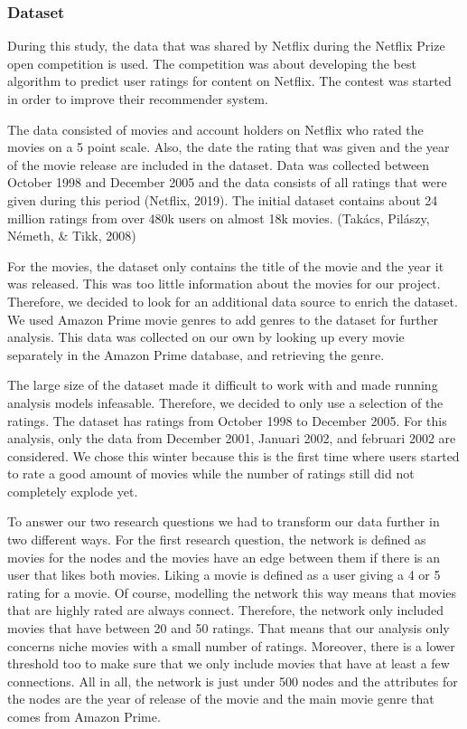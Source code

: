 \documentclass[
  english,
  man,floatsintext]{apa6}
\begin{document}
\hypertarget{dataset}{%
\subsubsection{Dataset}\label{dataset}}

During this study, the data that was shared by Netflix during the Netflix Prize open competition is used. The competition was about developing the best algorithm to predict user ratings for content on Netflix. The contest was started in order to improve their recommender system.

The data consisted of movies and account holders on Netflix who rated the movies on a 5 point scale. Also, the date the rating that was given and the year of the movie release are included in the dataset. Data was collected between October 1998 and December 2005 and the data consists of all ratings that were given during this period (Netflix, 2019). The initial dataset contains about 24 million ratings from over 480k users on almost 18k movies. (Takács, Pilászy, Németh, \& Tikk, 2008)

For the movies, the dataset only contains the title of the movie and the year it was released. This was too little information about the movies for our project. Therefore, we decided to look for an additional data source to enrich the dataset. We used Amazon Prime movie genres to add genres to the dataset for further analysis. This data was collected on our own by looking up every movie separately in the Amazon Prime database, and retrieving the genre.

The large size of the dataset made it difficult to work with and made running analysis models infeasable. Therefore, we decided to only use a selection of the ratings. The dataset has ratings from October 1998 to December 2005. For this analysis, only the data from December 2001, Januari 2002, and februari 2002 are considered. We chose this winter because this is the first time where users started to rate a good amount of movies while the number of ratings still did not completely explode yet.

To answer our two research questions we had to transform our data further in two different ways. For the first research question, the network is defined as movies for the nodes and the movies have an edge between them if there is an user that likes both movies. Liking a movie is defined as a user giving a 4 or 5 rating for a movie. Of course, modelling the network this way means that movies that are highly rated are always connect. Therefore, the network only included movies that have between 20 and 50 ratings. That means that our analysis only concerns niche movies with a small number of ratings. Moreover, there is a lower threshold too to make sure that we only include movies that have at least a few connections. All in all, the network is just under 500 nodes and the attributes for the nodes are the year of release of the movie and the main movie genre that comes from Amazon Prime.
\end{document}
